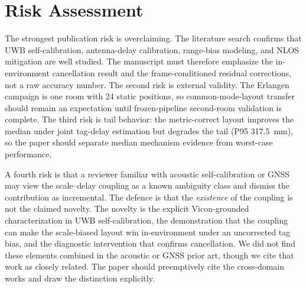 \documentclass[11pt,a4paper]{article}
\begin{document}
\section{Risk Assessment}

The strongest publication risk is overclaiming. The literature search confirms that UWB self-calibration, antenna-delay calibration, range-bias modeling, and NLOS mitigation are well studied. The manuscript must therefore emphasize the in-environment cancellation result and the frame-conditioned residual corrections, not a raw accuracy number. The second risk is external validity. The Erlangen campaign is one room with 24 static positions, so common-mode-layout transfer should remain an expectation until frozen-pipeline second-room validation is complete. The third risk is tail behavior: the metric-correct layout improves the median under joint tag-delay estimation but degrades the tail (P95 317.5~mm), so the paper should separate median mechanism evidence from worst-case performance.

A fourth risk is that a reviewer familiar with acoustic self-calibration or GNSS
may view the scale--delay coupling as a known ambiguity class and dismiss the
contribution as incremental. The defence is that the \emph{existence} of the
coupling is not the claimed novelty. The novelty is the explicit Vicon-grounded
characterization in UWB self-calibration, the demonstration that the coupling can
make the scale-biased layout win in-environment under an uncorrected tag
bias, and the diagnostic intervention that confirms cancellation. We did not find
these elements combined in the acoustic or GNSS prior art, though we cite that work
as closely related. The paper should
preemptively cite the cross-domain works and draw the distinction explicitly.
\end{document}
